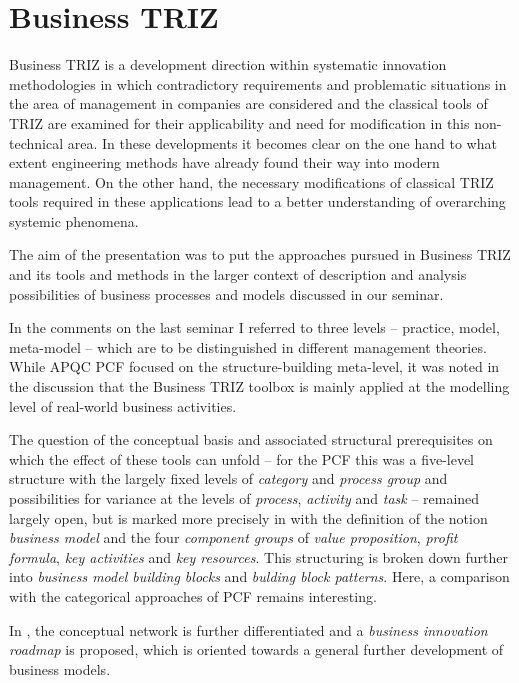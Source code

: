 \documentclass[11pt,a4paper]{article}
\begin{document}
\section{Business TRIZ}

Business TRIZ \cite{Souchkov2010, Souchkov2014, Souchkov2017, Souchkov2019} is
a development direction within systematic innovation methodologies in which
contradictory requirements and problematic situations in the area of
management in companies are considered and the classical tools of TRIZ are
examined for their applicability and need for modification in this
non-technical area. In these developments it becomes clear on the one hand to
what extent engineering methods have already found their way into modern
management. On the other hand, the necessary modifications of classical TRIZ
tools required in these applications lead to a better understanding of
overarching systemic phenomena.

The aim of the presentation was to put the approaches pursued in Business TRIZ
and its tools and methods in the larger context of description and analysis
possibilities of business processes and models discussed in our seminar.

In the comments on the last seminar I referred to three levels -- practice,
model, meta-model -- which are to be distinguished in different management
theories. While APQC PCF focused on the structure-building meta-level, it was
noted in the discussion that the Business TRIZ toolbox is mainly applied at
the modelling level of real-world business activities.

The question of the conceptual basis and associated structural prerequisites
on which the effect of these tools can unfold -- for the PCF this was a
five-level structure with the largely fixed levels of \emph{category} and
\emph{process group} and possibilities for variance at the levels of
\emph{process}, \emph{activity} and \emph{task} -- remained largely open, but
is marked more precisely in \cite{Souchkov2010} with the definition of the
notion \emph{business model} and the four \emph{component groups} of
\emph{value proposition}, \emph{profit formula}, \emph{key activities} and
\emph{key resources}. This structuring is broken down further into
\emph{business model building blocks} and \emph{bulding block patterns}. Here,
a comparison with the categorical approaches of PCF remains interesting.

In \cite{Souchkov2019}, the conceptual network is further differentiated and a
\emph{business innovation roadmap} is proposed, which is oriented towards a
general further development of business models.
\end{document}
